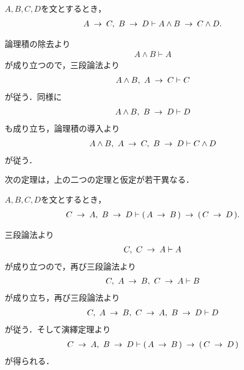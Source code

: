 	\begin{screen}
		\begin{logicalthm}[含意の論理積への遺伝性2]
		\label{logicalthm:heredity_of_implication_to_conjunction_2}
			$A,B,C,D$を文とするとき，
			\begin{align}
				A \rarrow C,\ B \rarrow D \vdash A \wedge B \rarrow C \wedge D.
			\end{align}
		\end{logicalthm}
	\end{screen}
	
	\begin{sketch}
		論理積の除去より
		\begin{align}
			A \wedge B \vdash A
		\end{align}
		が成り立つので，三段論法より
		\begin{align}
			A \wedge B,\ A \rarrow C \vdash C
		\end{align}
		が従う．同様に
		\begin{align}
			A \wedge B,\ B \rarrow D \vdash D
		\end{align}
		も成り立ち，論理積の導入より
		\begin{align}
			A \wedge B,\ A \rarrow C,\ B \rarrow D \vdash C \wedge D
		\end{align}
		が従う．
		\QED
	\end{sketch}
	
	次の定理は，上の二つの定理と仮定が若干異なる．
	
	\begin{screen}
		\begin{logicalthm}[含意の含意への遺伝性2]
		\label{logicalthm:heredity_of_implication_to_implication_2}
			$A,B,C,D$を文とするとき，
			\begin{align}
				C \rarrow A,\ B \rarrow D \vdash (\, A \rarrow B\, ) \rarrow (\, C \rarrow D\, ).
			\end{align}
		\end{logicalthm}
	\end{screen}
	
	\begin{sketch}
		三段論法より
		\begin{align}
			C,\ C \rarrow A \vdash A
		\end{align}
		が成り立つので，再び三段論法より
		\begin{align}
			C,\ A \rarrow B,\ C \rarrow A \vdash B
		\end{align}
		が成り立ち，再び三段論法より
		\begin{align}
			C,\ A \rarrow B,\ C \rarrow A,\ B \rarrow D \vdash D
		\end{align}
		が従う．そして演繹定理より
		\begin{align}
			C \rarrow A,\ B \rarrow D \vdash (\, A \rarrow B\, ) \rarrow (\, C \rarrow D\, )
		\end{align}
		が得られる．
		\QED
	\end{sketch}
	
